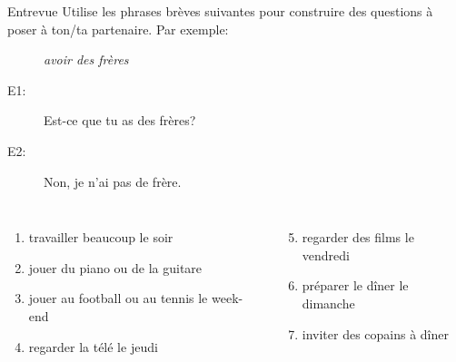 \begin{frame}{Entrevue}
  Utilise les phrases brèves suivantes pour construire des questions à poser à ton/ta partenaire.
  Par exemple: \\
  \begin{description}
    \item[] \emph{avoir des frères}
    \item[E1:] Est-ce que tu as des frères?
    \item[E2:] Non, je n'ai pas de frère.
  \end{description}
  \begin{columns}[t]
      \begin{enumerate}
        \item travailler beaucoup le soir
        \item jouer du piano ou de la guitare
        \item jouer au football ou au tennis le week-end
        \item regarder la télé le jeudi
      \end{enumerate}
      \begin{enumerate}
        \setcounter{enumi}{4}
        \item regarder des films le vendredi
        \item préparer le dîner le dimanche
        \item inviter des copains à dîner
      \end{enumerate}
  \end{columns}
\end{frame}